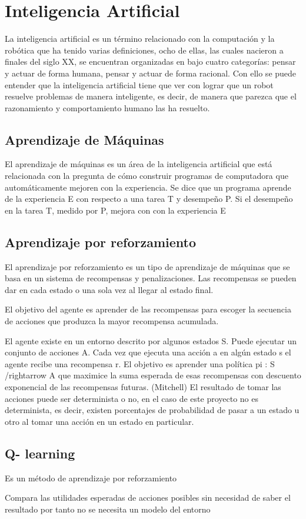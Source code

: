 \section{Inteligencia Artificial} \label{sect:Inteligencia_Artificial}
La inteligencia artificial es un término relacionado con la computación y la robótica que ha tenido varias definiciones, ocho de ellas, las cuales nacieron a finales del siglo XX, se encuentran organizadas en \cite{peterNorvig} bajo cuatro categorías: pensar y actuar de forma humana, pensar y actuar de forma racional. Con ello se puede entender que la inteligencia artificial tiene que ver con lograr que un robot resuelve problemas de manera inteligente, es decir, de manera que parezca que el razonamiento y comportamiento humano las ha resuelto.  

\subsection{ Aprendizaje de Máquinas}
El aprendizaje de máquinas es un área de la inteligencia artificial que está relacionada con la pregunta de cómo construir programas de computadora que automáticamente mejoren con la experiencia. Se dice que un programa aprende de la experiencia E con respecto a una tarea T y desempeño P. Si el desempeño en la tarea T, medido por P, mejora con con la experiencia E \cite{Mitchell}
\subsection{Aprendizaje por reforzamiento}
El aprendizaje por reforzamiento es un tipo de aprendizaje de máquinas que se basa en un sistema de recompensas y penalizaciones. Las recompensas se pueden dar en cada estado o una sola vez al llegar al estado final.

El objetivo del agente es aprender de las recompensas para escoger la secuencia de acciones que produzca la mayor recompensa acumulada. \cite{Mitchell}


El agente existe en un entorno descrito por algunos estados S. Puede ejecutar un conjunto de acciones A. Cada vez que ejecuta una acción a en algún estado s el agente recibe una recompensa r. El objetivo es aprender una política pi : S /rightarrow A que maximice la suma esperada de esas recompensas con descuento exponencial de las recompensas futuras. (Mitchell) El resultado de tomar las acciones puede ser determinista o no, en el caso de este proyecto no es determinista, es decir, existen porcentajes de probabilidad de pasar a un estado u otro al tomar una acción en un estado en particular.  

\subsection{ Q- learning}

Es un método de aprendizaje por reforzamiento

Compara las utilidades esperadas de acciones posibles sin necesidad de saber el resultado por tanto no se necesita un modelo del entorno \cite{peterNorvig}

